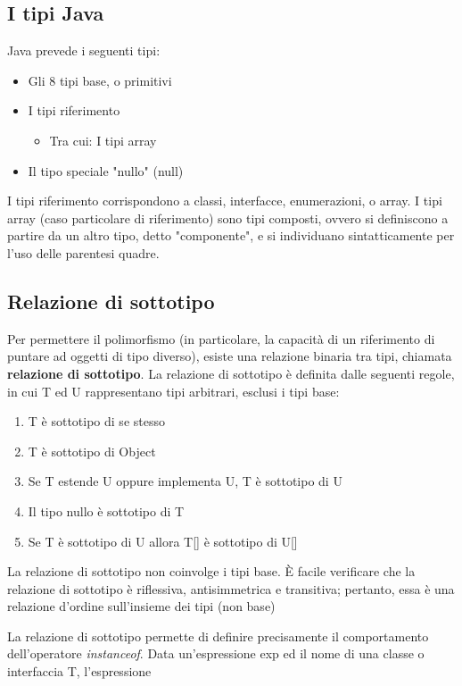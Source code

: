 \documentclass[10pt]{article}
\begin{document}
\subsection{I tipi Java}
Java prevede i seguenti tipi:
\begin{itemize}
    \item Gli 8 tipi base, o primitivi
    \item I tipi riferimento
    \begin{itemize}
        \item Tra cui: I tipi array
    \end{itemize}
    \item Il tipo speciale "nullo" (null)
    \end{itemize}
    I tipi riferimento corrispondono a classi, interfacce, enumerazioni, o array.
    I tipi array (caso particolare di riferimento) sono tipi composti, ovvero si definiscono a partire da un altro tipo, detto "componente", e si individuano sintatticamente per l'uso delle parentesi quadre.
\subsection{Relazione di sottotipo}
Per permettere il polimorfismo (in particolare, la capacità di un riferimento di puntare ad oggetti 
di tipo diverso), esiste una relazione binaria tra tipi, chiamata \textbf{relazione di sottotipo}.
La relazione di sottotipo è definita dalle seguenti regole, in cui T ed U rappresentano tipi 
arbitrari, esclusi i tipi base:
\begin{enumerate}
    \item T è sottotipo di se stesso
    \item T è sottotipo di Object
    \item Se T estende U oppure implementa U, T è sottotipo di U
    \item Il tipo nullo è sottotipo di T
    \item Se T è sottotipo di U allora T[] è sottotipo di U[]
\end{enumerate}
La relazione di sottotipo non coinvolge i tipi base.
È facile verificare che la relazione di sottotipo è riflessiva, antisimmetrica e transitiva; pertanto, essa è una relazione d'ordine sull'insieme dei tipi (non base)

La relazione di sottotipo permette di definire precisamente il comportamento dell'operatore 
\textit{instanceof}.
Data un'espressione exp ed il nome di una classe o interfaccia T, l'espressione\\
\end{document}

